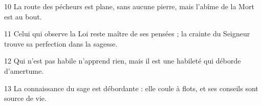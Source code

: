 
10 La route des pécheurs est plane, sans aucune pierre, mais l’abîme de la Mort est au bout.

11 Celui qui observe la Loi reste maître de ses pensées ; la crainte du Seigneur trouve sa perfection dans la sagesse.

12 Qui n’est pas habile n’apprend rien, mais il est une habileté qui déborde d’amertume.

13 La connaissance du sage est débordante : elle coule à flots, et ses conseils sont source de vie.